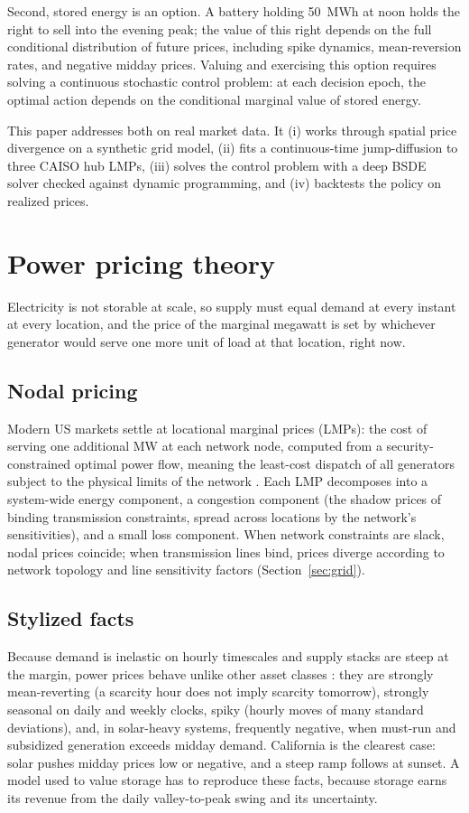 \documentclass[11pt]{article}
\begin{document}
Second, stored energy is an option. A battery holding
50~MWh at noon holds the right to sell into the evening peak; the value of this right
depends on the full conditional distribution of future prices, including spike dynamics,
mean-reversion rates, and negative midday prices. Valuing and exercising this option
requires solving a continuous stochastic control problem: at each decision epoch,
the optimal action depends on the conditional marginal value of stored energy.

This paper addresses both on real market data. It (i) works through
spatial price divergence on a synthetic grid model, (ii) fits a
continuous-time jump-diffusion to three CAISO hub LMPs, (iii) solves the
control problem with a deep BSDE solver checked against dynamic programming,
and (iv) backtests the policy on realized prices.

\section{Power pricing theory}

Electricity is not storable at scale, so supply must equal demand at every
instant at every location, and the price of the marginal megawatt is set
by whichever generator would serve one more unit of load at that
location, right now.

\subsection{Nodal pricing}
Modern US markets settle at locational marginal
prices (LMPs): the cost of serving one additional MW at each network node,
computed from a security-constrained optimal power flow, meaning the
least-cost dispatch of all generators subject to the physical limits of
the network \cite{schweppe1988}. Each LMP
decomposes into a system-wide energy component, a congestion component
(the shadow prices of binding transmission constraints, spread across
locations by the network's sensitivities), and a small loss component.
When network constraints are slack, nodal prices coincide; when transmission lines bind,
prices diverge according to network topology and line sensitivity factors
(Section~\ref{sec:grid}).

\subsection{Stylized facts}
Because demand is inelastic on hourly timescales
and supply stacks are steep at the margin, power prices behave unlike
other asset classes \cite{lucia2002,cartea2005}: they are strongly
mean-reverting (a scarcity hour does not imply scarcity tomorrow),
strongly seasonal on daily and weekly clocks, spiky (hourly moves of many
standard deviations), and, in solar-heavy systems, frequently
negative, when must-run and subsidized generation exceeds midday
demand. California is the clearest case: solar pushes midday prices low or
negative, and a steep ramp follows at sunset. A model used to value
storage has to reproduce these facts, because storage earns its revenue
from the daily valley-to-peak swing and its uncertainty.
\end{document}

